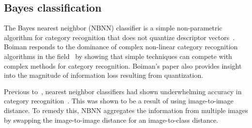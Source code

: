 





    \subsection{\Naive{} Bayes classification}\label{sec:nbnn}  

        The \Naive{} Bayes nearest neighbor (NBNN) classifier is a
          simple non-parametric algorithm for category recognition that
          does not quantize descriptor
          vectors~\cite{boiman_defense_2008}.
        Boiman responds to the dominance of complex non-linear category
          recognition algorithms in the field~\cite{varma_learning_2007,
          marszalek_learning_2007} by showing that simple techniques can
          compete with complex methods for category recognition.
        Boiman's paper also provides insight into the magnitude of
          information loss resulting from quantization.
          
        Previous to~\cite{boiman_defense_2008}, nearest neighbor
          classifiers had shown underwhelming accuracy in category
          recognition~\cite{varma_unifying_2004, lazebnik_beyond_2006,
          marszalek_learning_2007}.
        This was shown to be a result of using image-to-image distance.
        To remedy this, NBNN aggregates the information from multiple
          images by swapping the image-to-image distance for an
          image-to-class distance.

